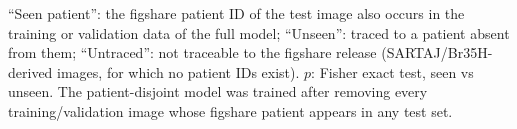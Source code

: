 ``Seen patient'': the figshare patient ID of the test image also occurs in the training or validation data of the full model; ``Unseen'': traced to a patient absent from them; ``Untraced'': not traceable to the figshare release (SARTAJ/Br35H-derived images, for which no patient IDs exist). $p$: Fisher exact test, seen vs unseen. The patient-disjoint model was trained after removing every training/validation image whose figshare patient appears in any test set.
